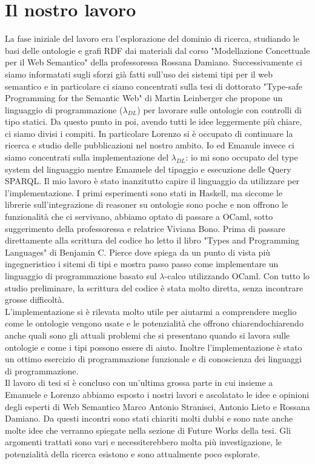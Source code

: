\section{Il nostro lavoro}
    La fase iniziale del lavoro era l'esplorazione del dominio di ricerca,
    studiando le basi delle ontologie e grafi RDF dai materiali dal corso "Modellazione Concettuale per il Web Semantico" della professoressa Rossana Damiano.
    Successivamente ci siamo informatati sugli sforzi già fatti sull'uso dei sistemi tipi per il web semantico e in particolare ci siamo concentrati sulla tesi di
    dottorato "Type-safe Programming for the Semantic Web" di Martin Leinberger che propone un linguaggio di programmazione ($\lambda_{DL}$) per lavorare sulle ontologie con 
    controlli di tipo statici. Da questo punto in poi, avendo tutti le idee leggermente più chiare, ci siamo divisi i compiti. In particolare Lorenzo si
    è occupato di continuare la ricerca e studio delle pubblicazioni nel nostro ambito. Io ed Emanule invece ci siamo concentrati sulla implementazione
    del $\lambda_{DL}$: io mi sono occupato del type system del linguaggio mentre Emanuele del tipaggio e esecuzione delle Query SPARQL.
    Il mio lavoro è stato inanzitutto capire il linguaggio da utilizzare per l'implementazione. I primi esperimenti sono stati in Haskell, ma siccome le librerie
    sull'integrazione di reasoner su ontologie sono poche e non offrono le funzionalità che ci servivano, abbiamo optato di passare a OCaml, sotto suggerimento della professoressa e relatrice Viviana Bono. 
    Prima di passare direttamente alla scrittura del codice ho letto il libro "Types and Programming Languages" di Benjamin C. Pierce dove spiega da un punto di vista
    più ingegneristico i sitemi di tipi e mostra passo passo come implementare un linguaggio di programmazione basato sul $\lambda$-calco utilizzando OCaml.
    Con tutto lo studio preliminare, la scrittura del codice è stata molto diretta, senza incontrare grosse difficoltà.
    \\L'implementazione si è rilevata molto utile per aiutarmi a comprendere meglio come le ontologie vengono usate e le potenzialità che offrono chiarendochiarendo anche
    quali sono gli attuali problemi che si presentano quando si lavora sulle ontologie e come i tipi possono essere di aiuto. Inoltre l'implementazione è stato un ottimo
    esercizio di programmazione funzionale e di conoscienza dei linguaggi di programmazione.
    \\Il lavoro di tesi si è concluso con un'ultima grossa parte in cui insieme a Emanuele e Lorenzo abbiamo esposto i nostri lavori e ascolatato le idee e opinioni degli esperti
    di Web Semantico Marco Antonio Stranisci, Antonio Lieto e Rossana Damiano. Da questi incontri sono stati chiariti molti dubbi e sono nate anche molte idee che verranno
    spiegate nella sezione di Future Works della tesi. Gli argomenti trattati sono vari e necessiterebbero molta più investigazione, le potenzialità della ricerca esistono
    e sono attualmente poco esplorate. 
